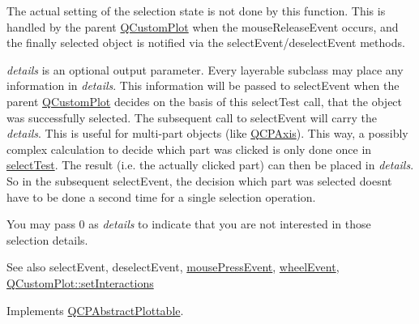 The actual setting of the selection state is not done by this function. This is handled by the parent \hyperlink{class_q_custom_plot}{Q\+Custom\+Plot} when the mouse\+Release\+Event occurs, and the finally selected object is notified via the select\+Event/deselect\+Event methods.

{\itshape details} is an optional output parameter. Every layerable subclass may place any information in {\itshape details}. This information will be passed to select\+Event when the parent \hyperlink{class_q_custom_plot}{Q\+Custom\+Plot} decides on the basis of this select\+Test call, that the object was successfully selected. The subsequent call to select\+Event will carry the {\itshape details}. This is useful for multi-\/part objects (like \hyperlink{class_q_c_p_axis}{Q\+C\+P\+Axis}). This way, a possibly complex calculation to decide which part was clicked is only done once in \hyperlink{class_q_c_p_color_map_afb4b843596addf58096082827a9e3450}{select\+Test}. The result (i.\+e. the actually clicked part) can then be placed in {\itshape details}. So in the subsequent select\+Event, the decision which part was selected doesn\textquotesingle{}t have to be done a second time for a single selection operation.

You may pass 0 as {\itshape details} to indicate that you are not interested in those selection details.

\begin{DoxySeeAlso}{See also}
select\+Event, deselect\+Event, \hyperlink{class_q_c_p_layerable_af6567604818db90f4fd52822f8bc8376}{mouse\+Press\+Event}, \hyperlink{class_q_c_p_layerable_a47dfd7b8fd99c08ca54e09c362b6f022}{wheel\+Event}, \hyperlink{class_q_custom_plot_a5ee1e2f6ae27419deca53e75907c27e5}{Q\+Custom\+Plot\+::set\+Interactions} 
\end{DoxySeeAlso}


Implements \hyperlink{class_q_c_p_abstract_plottable_a38efe9641d972992a3d44204bc80ec1d}{Q\+C\+P\+Abstract\+Plottable}.

